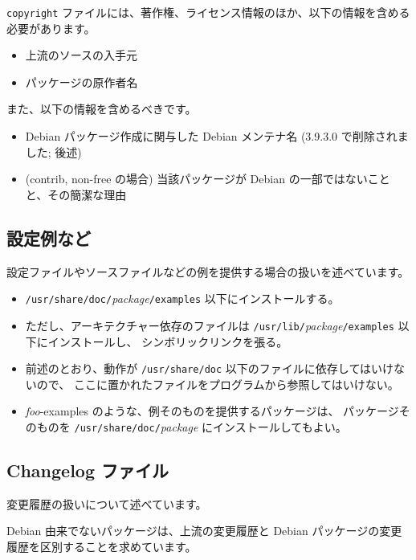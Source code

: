 \documentclass[mingoth,a4paper]{jsarticle}
\begin{document}
{\tt copyright} ファイルには、著作権、ライセンス情報のほか、以下の情報を含める必要があります。

\begin{itemize}
\item 上流のソースの入手元
\item パッケージの原作者名
\end{itemize}

また、以下の情報を含めるべきです。

\begin{itemize}
\item Debian パッケージ作成に関与した Debian メンテナ名 (3.9.3.0 で削除されました; 後述)
\item (contrib, non-free の場合) 当該パッケージが Debian の一部ではないことと、その簡潔な理由
\end{itemize}

\subsection{設定例など}

設定ファイルやソースファイルなどの例を提供する場合の扱いを述べています。

\begin{itemize}
\item {\tt /usr/share/doc/}{\it package}{\tt /examples} 以下にインストールする。
\item ただし、アーキテクチャー依存のファイルは
{\tt /usr/lib/}{\it package}{\tt /examples} 以下にインストールし、
シンボリックリンクを張る。
\item 前述のとおり、動作が {\tt /usr/share/doc} 以下のファイルに依存してはいけないので、
ここに置かれたファイルをプログラムから参照してはいけない。
\item {\it foo}-examples のような、例そのものを提供するパッケージは、
パッケージそのものを {\tt /usr/share/doc/}{\it package} にインストールしてもよい。
\end{itemize}

\subsection{Changelog ファイル}

変更履歴の扱いについて述べています。

Debian 由来でないパッケージは、上流の変更履歴と Debian パッケージの変更履歴を区別することを求めています。
\end{document}
